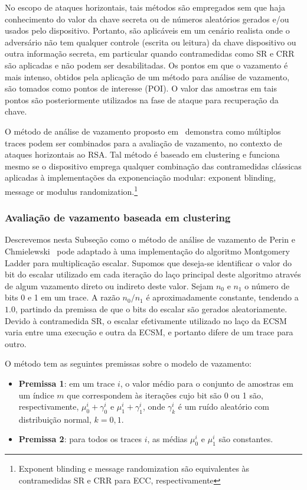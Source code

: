 No escopo de ataques horizontais, tais métodos são empregados sem que haja conhecimento do valor da chave secreta ou de números aleatórios gerados e/ou usados pelo dispositivo. Portanto, são aplicáveis em um cenário realista onde o adversário não tem qualquer controle (escrita ou leitura) da chave dispositivo ou outra informação secreta, em particular quando contramedidas como SR e CRR são aplicadas e não podem ser desabilitadas. Os pontos em que o vazamento é mais intenso, obtidos pela aplicação de um método para análise de vazamento, são tomados como pontos de interesse (POI). O valor das amostras em tais pontos são posteriormente utilizados na fase de ataque para recuperação da chave.

O método de análise de vazamento proposto em~\cite{PerinChmielewski2015} demonstra como múltiplos traces podem ser combinados para a avaliação de vazamento, no contexto de ataques horizontais ao RSA. Tal método é baseado em clustering e funciona mesmo se o dispositivo emprega qualquer combinação das contramedidas clássicas aplicadas à implementações da exponenciação modular: exponent blinding, message or modulus randomization.\footnote{Exponent blinding e message randomization são equivalentes às contramedidas SR e CRR para ECC, respectivamente}

\subsubsection{Avaliação de vazamento baseada em clustering}

Descrevemos nesta Subseção como o método de análise de vazamento de Perin e Chmielewski~\cite{PerinChmielewski2015} pode adaptado à uma implementação do algoritmo Montgomery Ladder para multiplicação escalar. Supomos que deseja-se identificar o valor do bit do escalar utilizado em cada iteração do laço principal deste algoritmo através de algum vazamento direto ou indireto deste valor. Sejam $n_0$ e $n_1$ o número de bits 0 e 1 em um trace. A razão $n_0/n_1$ é aproximadamente constante, tendendo a $1.0$, partindo da premissa de que o bits do escalar são gerados aleatoriamente. Devido à contramedida SR, o escalar efetivamente utilizado no laço da ECSM varia entre uma execução e outra da ECSM, e portanto difere de um trace para outro.

O método tem as seguintes premissas sobre o modelo de vazamento:
\begin{itemize}
	\item \textbf{Premissa 1}: em um trace $i$, o valor médio para o conjunto de amostras em um índice $m$ que correspondem às iterações cujo bit são 0 ou 1 são, respectivamente, $\mu_0^i + \gamma_0^i$ e $\mu_1^i + \gamma_1^i$, onde $\gamma_k^i$ é um ruído aleatório com distribuição normal, $k=0,1$.
	\item \textbf{Premissa 2}: para todos os traces $i$, as médias $\mu_0^i$ e $\mu_1^i$ são constantes.
\end{itemize}

